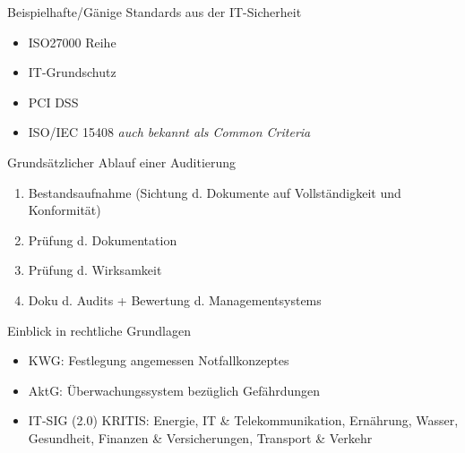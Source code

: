 \documentclass{cheatsheet}
\begin{document}
    \begin{hintbox}{Beispielhafte/Gänige Standards aus der IT-Sicherheit}
        \begin{itemize}
            \item ISO27000 Reihe
            \item IT-Grundschutz
            \item PCI DSS
            \item ISO/IEC 15408 \textit{auch bekannt als Common Criteria}
        \end{itemize}
    \end{hintbox}
    \begin{hintbox}{Grundsätzlicher Ablauf einer Auditierung}
        \begin{enumerate}
            \item Bestandsaufnahme (Sichtung d. Dokumente auf Vollständigkeit und Konformität)
            \item Prüfung d. Dokumentation
            \item Prüfung d. Wirksamkeit
            \item Doku d. Audits + Bewertung d. Managementsystems
        \end{enumerate}
    \end{hintbox}
    \begin{sectionbox}{Einblick in rechtliche Grundlagen}
        \begin{itemize}
            \item KWG: Festlegung angemessen Notfallkonzeptes
            \item AktG: Überwachungssystem bezüglich Gefährdungen
            \item IT-SIG (2.0) \ra KRITIS: Energie, IT \& Telekommunikation, Ernährung, Wasser, Gesundheit, Finanzen \& Versicherungen, Transport \& Verkehr
        \end{itemize}
    \end{sectionbox}
\end{document}
